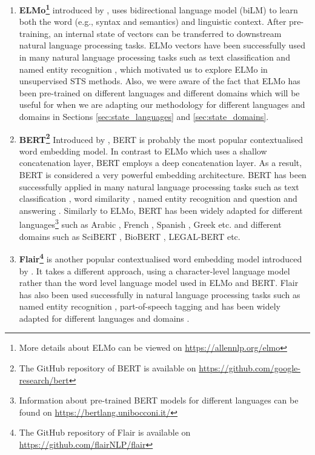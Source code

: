 \begin{enumerate}
\item \textbf{ELMo\footnote{More details about ELMo can be viewed on \url{https://allennlp.org/elmo}}}
introduced by \textcite{peters-etal-2018-deep}, uses bidirectional language model (biLM) to learn both the word (e.g., syntax and semantics) and linguistic context. After pre-training, an internal state of vectors can be transferred to downstream natural language processing tasks. ELMo vectors have been successfully used in many natural language processing tasks such as text classification \autocite{jiang-etal-2019-team} and named entity recognition \autocite{Luo2018}, which motivated us to explore ELMo in unsupervised STS methods. Also, we were aware of the fact that ELMo has been pre-trained on different languages \autocite{che-EtAl:2018:K18-2} and different domains \autocite{jin2019probing} which will be useful for when we are adapting our methodology for different languages and domains in Sections \ref{sec:state_languages} and \ref{sec:state_domains}.

\item \textbf{BERT\footnote{The GitHub repository of BERT is available on \url{https://github.com/google-research/bert}}} Introduced by \textcite{devlin-etal-2019-bert}, BERT is probably the most popular contextualised word embedding model. In contrast to ELMo which uses a shallow concatenation layer, BERT employs a deep concatenation layer. As a result, BERT is considered a very powerful embedding architecture. BERT has been successfully applied in many natural language processing tasks such as text classification \autocite{Ranasinghe2019a}, word similarity \autocite{hettiarachchi-etal-2020-brums}, named entity recognition \autocite{10.1145/3394486.3403149} and question and answering \autocite{yang-etal-2019-end}. Similarly to ELMo, BERT has been widely adapted for different languages\footnote{Information about pre-trained BERT models for different languages can be found on \url{https://bertlang.unibocconi.it/}} such as Arabic \autocite{antoun-etal-2020-arabert}, French \autocite{martin-etal-2020-camembert}, Spanish \autocite{CaneteCFP2020}, Greek \autocite{10.1145/3411408.3411440} etc. and different domains such as SciBERT \autocite{beltagy-etal-2019-scibert}, BioBERT \autocite{10.1093/bioinformatics/btz682}, LEGAL-BERT \autocite{chalkidis-etal-2020-legal} etc.  

\item \textbf{Flair\footnote{The GitHub repository of Flair is available on \url{https://github.com/flairNLP/flair}}} is another popular contextualised word embedding model introduced by \textcite{akbik-etal-2018-contextual}. It takes a different approach, using a character-level language model rather than the word level language model used in ELMo and BERT. Flair has also been used successfully in natural language processing tasks such as named entity recognition \autocite{akbik-etal-2019-pooled}, part-of-speech tagging \autocite{akbik-etal-2018-contextual} and has been widely adapted for different languages and domains \autocite{akbik-etal-2018-contextual,sharma2019bioflair}.

\end{enumerate}

